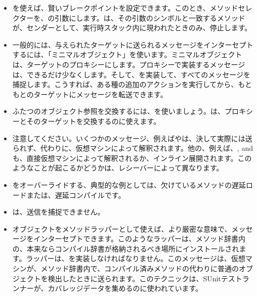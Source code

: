 \documentclass[a4paper,10pt,twoside]{book}
\begin{document}
\begin{itemize}
\item {}を使えば、賢いブレークポイントを設定できます。このとき、メソッドセレクターを、の引数にします。は、その引数のシンボルと一致するメソッドが、センダーとして、実行時スタック内に現われたときのみ、停止します。
\item 一般的には、与えられたターゲットに送られるメッセージをインターセプトするには、「ミニマルオブジェクト」を使います。ミニマルオブジェクトは、ターゲットのプロキシーにします。プロキシーで実装するメッセージは、できるだけ少なくします。そして、を実装して、すべてのメッセージを捕捉します。こうすれば、ある種の追加のアクションを実行してから、もともとのターゲットにメッセージを転送できます。
\item ふたつのオブジェクト参照を交換するには、を使いましょう。は、プロキシーとそのターゲットを交換するのに使えます。
\item 注意してください。いくつかのメッセージ、例えばやは、決して実際には送られず、代わりに、仮想マシンによって解釈されます。他の、例えば、\ct{+}, \ct{-} and  も、直接仮想マシンによって解釈されるか、インライン展開されます。このようなことが起こるかどうかは、レシーバーによって異なります。 %
\item {}をオーバーライドする、典型的な例としては、欠けているメソッドの遅延ロードまたは、遅延コンパイルです。
\item {}は、\self 送信を捕捉できません。
\item オブジェクトをメソッドラッパーとして使えば、より厳密な意味で、メッセージをインターセプトできます。このようなラッパーは、メソッド辞書内の、本来ならコンパイル辞書が格納されるべき場所にインストールされます。ラッパーは、を実装しなければなりません。このメッセージは、仮想マシンが、メソッド辞書内で、コンパイル済みメソッドの代わりに普通のオブジェクトを検出したときに送られます。このテクニックは、SUnitテストランナーが、カバレッジデータを集めるのに使われています。 %
\end{itemize}

\ifx\wholebook\relax\else
   
   
\end{document}
